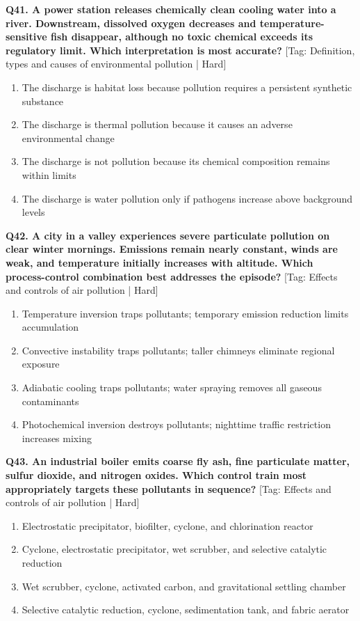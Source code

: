 \noindent\textbf{Q41. A power station releases chemically clean cooling water into a river. Downstream, dissolved oxygen decreases and temperature-sensitive fish disappear, although no toxic chemical exceeds its regulatory limit. Which interpretation is most accurate?} \hfill [Tag: Definition, types and causes of environmental pollution | Hard]
\begin{enumerate}[label=(\alph*),topsep=2pt,itemsep=1pt,partopsep=0pt,parsep=0pt]
    \item {The discharge is habitat loss because pollution requires a persistent synthetic substance}
    \item {The discharge is thermal pollution because it causes an adverse environmental change}
    \item {The discharge is not pollution because its chemical composition remains within limits}
    \item {The discharge is water pollution only if pathogens increase above background levels}
\end{enumerate}
\vspace{2mm}

\noindent\textbf{Q42. A city in a valley experiences severe particulate pollution on clear winter mornings. Emissions remain nearly constant, winds are weak, and temperature initially increases with altitude. Which process-control combination best addresses the episode?} \hfill [Tag: Effects and controls of air pollution | Hard]
\begin{enumerate}[label=(\alph*),topsep=2pt,itemsep=1pt,partopsep=0pt,parsep=0pt]
    \item {Temperature inversion traps pollutants; temporary emission reduction limits accumulation}
    \item {Convective instability traps pollutants; taller chimneys eliminate regional exposure}
    \item {Adiabatic cooling traps pollutants; water spraying removes all gaseous contaminants}
    \item {Photochemical inversion destroys pollutants; nighttime traffic restriction increases mixing}
\end{enumerate}
\vspace{2mm}

\noindent\textbf{Q43. An industrial boiler emits coarse fly ash, fine particulate matter, sulfur dioxide, and nitrogen oxides. Which control train most appropriately targets these pollutants in sequence?} \hfill [Tag: Effects and controls of air pollution | Hard]
\begin{enumerate}[label=(\alph*),topsep=2pt,itemsep=1pt,partopsep=0pt,parsep=0pt]
    \item {Electrostatic precipitator, biofilter, cyclone, and chlorination reactor}
    \item {Cyclone, electrostatic precipitator, wet scrubber, and selective catalytic reduction}
    \item {Wet scrubber, cyclone, activated carbon, and gravitational settling chamber}
    \item {Selective catalytic reduction, cyclone, sedimentation tank, and fabric aerator}
\end{enumerate}
\vspace{2mm}

